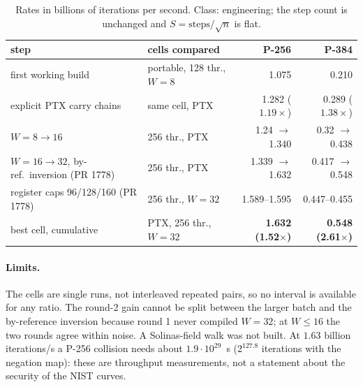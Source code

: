 \documentclass[10pt,a4paper]{article}
\begin{document}
\begin{table}[h]
\centering
\small
\begin{tabular}{@{}llrr@{}}
\toprule
step & cells compared & P-256 & P-384 \\
\midrule
first working build & portable, 128 thr., $W=8$ & 1.075 & 0.210 \\
explicit PTX carry chains & same cell, PTX & 1.282 ($1.19\times$) & 0.289 ($1.38\times$) \\
$W=8\to16$ & 256 thr., PTX & 1.24 $\to$ 1.340 & 0.32 $\to$ 0.438 \\
$W=16\to32$, by-ref.\ inversion (PR 1778) & 256 thr., PTX & 1.339 $\to$ 1.632 & 0.417 $\to$ 0.548 \\
register caps 96/128/160 (PR 1778) & 256 thr., $W=32$ & 1.589--1.595 & 0.447--0.455 \\
\midrule
best cell, cumulative & PTX, 256 thr., $W=32$ & \textbf{1.632 (1.52$\times$)} & \textbf{0.548 (2.61$\times$)} \\
\bottomrule
\end{tabular}
\caption{Rates in billions of iterations per second. Class: engineering; the step count is unchanged
  and $S=\text{steps}/\sqrt n$ is flat.}
\end{table}

\paragraph{Limits.} The cells are single runs, not interleaved repeated
pairs, so no interval is available for any ratio. The round-2 gain cannot
be split between the larger batch and the by-reference inversion because
round 1 never compiled $W=32$; at $W\le16$ the two rounds agree within
noise. A Solinas-field walk was not built. At $1.63$ billion iterations/s a P-256
collision needs about $1.9\cdot10^{29}$~s ($2^{127.8}$ iterations with the negation map): these are throughput
measurements, not a statement about the security of the NIST curves.
\end{document}
